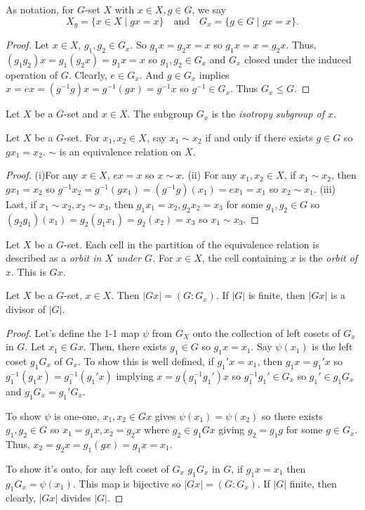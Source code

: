 \begin{note}
    As notation, for $G$-set $X$ with $x \in X, g \in G$, we say $$X_g=\{x \in X\mid gx =x\}\quad\text{and}\quad G_x=\{g \in G\mid gx=x\}.$$
\end{note}
\begin{proof}
    Let $x \in X$, $g_1, g_2 \in G_x$. So $g_1x=g_2x=x$ so $g_1x=x=g_2x$. Thus, $(g_1g_2)x=g_1(g_2x)=g_1x=x$ so $g_1, g_2 \in G_x$ and $G_x$ closed under the induced operation of $G$. Clearly, $e \in G_x$. And $g \in G_x$ implies $x = ex = (g^{-1}g)x = g^{-1}(gx) = g^{-1}x$ so $g^{-1} \in G_x$. Thus $G_x \leq G$.
\end{proof}
\begin{definition}
    Let $X$ be a $G$-set and $x \in X$. The subgroup $G_x$ is the \emph{isotropy subgroup of $x$}.
\end{definition}
\begin{theorem}
    Let $X$ be a $G$-set. For $x_1, x_2 \in X$, say $x_1\sim x_2$ if and only if there exists $g \in G$ so $gx_1 = x_2$. $\sim$ is an equivalence relation on $X$.
\end{theorem}
\begin{proof}
    (i)For any $x \in X$, $ex = x$ so $x\sim x$. (ii) For any $x_1, x_2 \in X$, if $x_1 \sim x_2$, then $gx_1 = x_2$ so $g^{-1}x_2=g^{-1}(gx_1)=(g^{-1}g)(x_1)=ex_1=x_1$ so $x_2 \sim x_1$. (iii) Last, if $x_1\sim x_2, x_2 \sim x_3$, then $g_1x_1=x_2, g_2x_2=x_3$ for some $g_1, g_2 \in G$ so $(g_2g_1)(x_1) = g_2(g_1x_1) = g_2(x_2) = x_3$ so $x_1 \sim x_3$.
\end{proof}
\begin{definition}[Orbit of $x$]
    Let $X$ be a $G$-set. Each cell in the partition of the equivalence relation is described as a \emph{orbit in $X$ under $G$.} For $x \in X$, the cell containing $x$ is the \emph{orbit of $x$}. This is $Gx$.  
\end{definition}
\begin{theorem}
    Let $X$ be a $G$-set, $x \in X$. Then $\left|Gx\right| = (G\colon G_x)$. If $\left|G\right|$ is finite, then $|Gx|$ is a divisor of $|G|$.
\end{theorem}
\begin{proof}
    Let's define the 1-1 map $\psi$ from $G_X$ onto the collection of left cosets of $G_x$ in $G$. Let $x_1 \in Gx$. Then, there exists $g_1 \in G$ so $g_1x = x_1$. Say $\psi(x_1)$ is the left coset $g_1G_x$ of $G_x$. To show this is well defined, if $g_1'x = x_1$, then $g_1x = g_1'x$ so $g_1^{-1}(g_1x)=g_1^{-1}(g_1'x)$ implying $x = g(g_1^{-1}g_1')x$ so $g_1^{-1}g_1' \in G_x$ so $g_1' \in g_1G_x$ and $g_1G_x = g_1'G_x$.

    To show $\psi$ is one-one, $x_1,x_2 \in Gx$ gives $\psi(x_1)=\psi(x_2)$ so there exists $g_1, g_2 \in G$ so $x_1 = g_1x, x_2 = g_2x$ where $g_2 \in g_1Gx$ giving $g_2 = g_1g$ for some $g \in G_x$. Thus, $x_2 = g_2x = g_1(gx) = g_1x = x_1$. 

    To show it's onto, for any left coset of $G_x$ $g_1G_x$ in $G$, if $g_1x=x_1$ then $g_1G_x = \psi(x_1)$. This map is bijective so $|Gx| = (G\colon G_x)$. If $|G|$ finite, then clearly, $|Gx|$ divides $|G|$.
\end{proof}